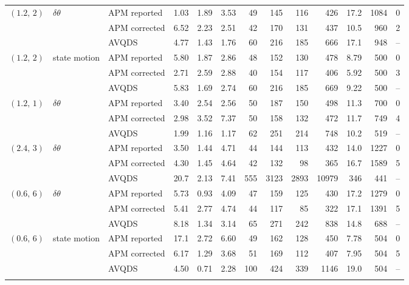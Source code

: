 \documentclass[10pt]{article}
\begin{document}
\begin{table}[H]
\begin{tabular}{lllrrrrrrrrrr}
\addlinespace[2pt]
$(1.2,\,2)$ & $\delta\theta$ & APM reported & 1.03 & 1.89 & 3.53 & 49 & 145 & 116 & 426 & 17.2 & 1084 & 0 \\
 &  & APM corrected & 6.52 & 2.23 & 2.51 & 42 & 170 & 131 & 437 & 10.5 & 960 & 2 \\
 &  & AVQDS & 4.77 & 1.43 & 1.76 & 60 & 216 & 185 & 666 & 17.1 & 948 & -- \\
\addlinespace[2pt]
$(1.2,\,2)$ & state motion & APM reported & 5.80 & 1.87 & 2.86 & 48 & 152 & 130 & 478 & 8.79 & 500 & 0 \\
 &  & APM corrected & 2.71 & 2.59 & 2.88 & 40 & 154 & 117 & 406 & 5.92 & 500 & 3 \\
 &  & AVQDS & 5.83 & 1.69 & 2.74 & 60 & 216 & 185 & 669 & 9.22 & 500 & -- \\
\addlinespace[2pt]
$(1.2,\,1)$ & $\delta\theta$ & APM reported & 3.40 & 2.54 & 2.56 & 50 & 187 & 150 & 498 & 11.3 & 700 & 0 \\
 &  & APM corrected & 2.98 & 3.52 & 7.37 & 50 & 158 & 132 & 472 & 11.7 & 749 & 4 \\
 &  & AVQDS & 1.99 & 1.16 & 1.17 & 62 & 251 & 214 & 748 & 10.2 & 519 & -- \\
\addlinespace[2pt]
$(2.4,\,3)$ & $\delta\theta$ & APM reported & 3.50 & 1.44 & 4.71 & 44 & 144 & 113 & 432 & 14.0 & 1227 & 0 \\
 &  & APM corrected & 4.30 & 1.45 & 4.64 & 42 & 132 & 98 & 365 & 16.7 & 1589 & 5 \\
 &  & AVQDS & 20.7 & 2.13 & 7.41 & 555 & 3123 & 2893 & 10979 & 346 & 441 & -- \\
\addlinespace[2pt]
$(0.6,\,6)$ & $\delta\theta$ & APM reported & 5.73 & 0.93 & 4.09 & 47 & 159 & 125 & 430 & 17.2 & 1279 & 0 \\
 &  & APM corrected & 5.41 & 2.77 & 4.74 & 44 & 117 & 85 & 322 & 17.1 & 1391 & 5 \\
 &  & AVQDS & 8.18 & 1.34 & 3.14 & 65 & 271 & 242 & 838 & 14.8 & 688 & -- \\
\addlinespace[2pt]
$(0.6,\,6)$ & state motion & APM reported & 17.1 & 2.72 & 6.60 & 49 & 162 & 128 & 450 & 7.78 & 504 & 0 \\
 &  & APM corrected & 6.17 & 1.29 & 3.68 & 51 & 169 & 112 & 407 & 7.95 & 504 & 5 \\
 &  & AVQDS & 4.50 & 0.71 & 2.28 & 100 & 424 & 339 & 1146 & 19.0 & 504 & -- \\
\addlinespace[2pt]
\bottomrule\end{tabular}\end{table}
\end{document}
